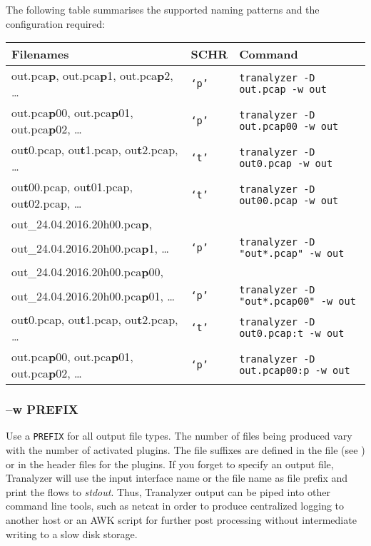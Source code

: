 The following table summarises the supported naming patterns and the configuration required:
\begin{longtable}{lll}
    \toprule
    {\bf Filenames} & {\bf SCHR} & {\bf Command}\\
    \midrule\endhead%
    out.pca{\bf p}, out.pca{\bf p}1, out.pca{\bf p}2, \ldots     & {\tt `p'} & {\tt tranalyzer -D out.pcap -w out}\\
    out.pca{\bf p}00, out.pca{\bf p}01, out.pca{\bf p}02, \ldots & {\tt `p'} & {\tt tranalyzer -D out.pcap00 -w out}\\
    ou{\bf t}0.pcap, ou{\bf t}1.pcap, ou{\bf t}2.pcap, \ldots    & {\tt `t'} & {\tt tranalyzer -D out0.pcap -w out}\\
    ou{\bf t}00.pcap, ou{\bf t}01.pcap, ou{\bf t}02.pcap, \ldots & {\tt `t'} & {\tt tranalyzer -D out00.pcap -w out}\\
    out\_24.04.2016.20h00.pca{\bf p},\\
    \qquad out\_24.04.2016.20h00.pca{\bf p}1, \ldots             & {\tt `p'} & {\tt tranalyzer -D "out*.pcap" -w out}\\
    out\_24.04.2016.20h00.pca{\bf p}00, & \\
    \qquad out\_24.04.2016.20h00.pca{\bf p}01, \ldots            & {\tt `p'} & {\tt tranalyzer -D "out*.pcap00" -w out}\\
    ou{\bf t}0.pcap, ou{\bf t}1.pcap, ou{\bf t}2.pcap, \ldots    & {\tt `t'} & {\tt tranalyzer -D out0.pcap:t -w out}\\
    out.pca{\bf p}00, out.pca{\bf p}01, out.pca{\bf p}02, \ldots & {\tt `p'} & {\tt tranalyzer -D out.pcap00:p -w out}\\
    \bottomrule
\end{longtable}

\subsubsection{--w PREFIX}
Use a {\tt PREFIX} for all output file types. The number of files being produced vary with the number of activated plugins. The file suffixes are defined in the file  (see ) or in the header files for the plugins. If you forget to specify an output file, Tranalyzer will use the input interface name or the file name as file prefix and print the flows to {\em stdout}. Thus, Tranalyzer output can be piped into other command line tools, such as netcat in order to produce centralized logging to another host or an AWK script for further post processing without intermediate writing to a slow disk storage.

